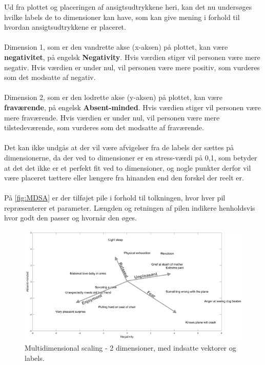 \noindent Ud fra plottet og placeringen af ansigtsudtrykkene heri, kan det nu undersøges hvilke labels de to dimensioner kan have, som kan give mening i forhold til hvordan ansigtsudtrykkene er placeret. 
\\\\
Dimension 1, som er den vandrette akse (x-aksen) på plottet, kan være \textbf{negativitet}, på engelsk \textbf{Negativity}. Hvis værdien stiger vil personen være mere negativ. Hvis værdien er under nul, vil personen være mere positiv, som vurderes som det modsatte af negativ. 
\\\\
Dimension 2, som er den lodrette akse (y-aksen) på plottet, kan være \textbf{fraværende}, på engelsk \textbf{Absent-minded}. Hvis værdien stiger vil personen være mere fraværende. Hvis værdien er under nul, vil personen være mere tilstedeværende, som vurderes som det modsatte af fraværende. 
\\\\
Det kan ikke undgås at der vil være afvigelser fra de labels der sættes på dimensionerne, da der ved to dimensioner er en stress-værdi på 0,1, som betyder at det det ikke er et perfekt fit ved to dimensioner, og nogle punkter derfor vil være placeret tættere eller længere fra hinanden end den forskel der reelt er.
\\\\
På \autoref{fig:MDSA} er der tilføjet pile i forhold til tolkningen, hvor hver pil repræsenterer et parameter. Længden og retningen af pilen indikere henholdsvis hvor godt den passer og hvornår den øges. 
%
\begin{figure}[H]
\centering
\includegraphics[width =\textwidth]{Figure/MSD_PlotArrows.png} 
\caption{Multidimensional scaling - 2 dimensioner, med indsatte vektorer og labels.}
\label{fig:MDSA}
\end{figure}
\noindent
%